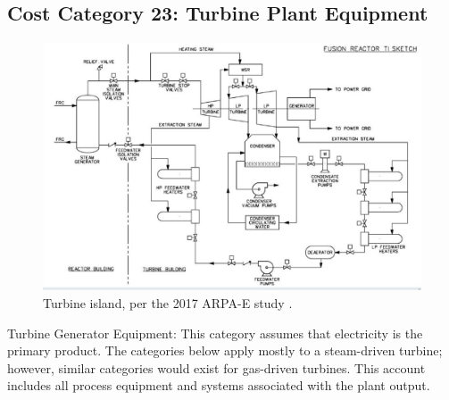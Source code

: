 \subsection{Cost Category 23: Turbine Plant Equipment}

\begin{figure}[h!]   
\centering   
\includegraphics[scale=0.5]{StandardFigures/TIsketch.eps}   
\caption{Turbine island, per the 2017 ARPA-E study \cite{Bechtel2017}.}   
\label{fig:ti}   
\end{figure}   

Turbine Generator Equipment: This category assumes that electricity is the primary product. The categories below apply mostly to a steam-driven turbine; however, similar categories would exist for gas-driven turbines. This account includes all process equipment and systems associated with the plant output.

